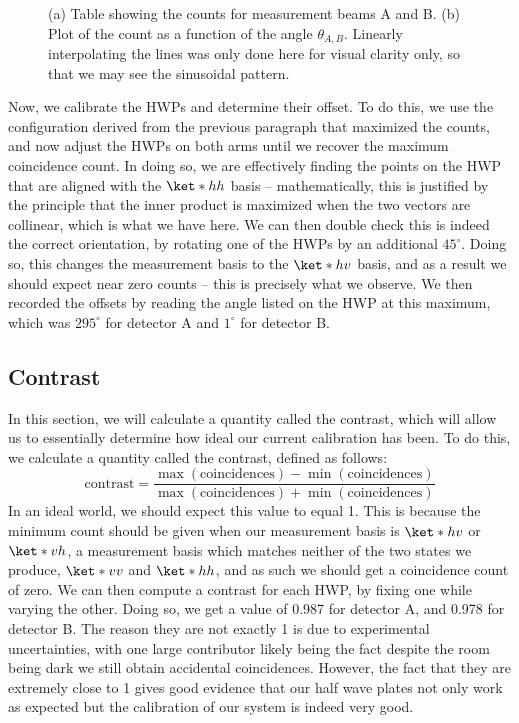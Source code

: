 \documentclass[10pt]{article}
\begin{document}
\begin{figure}
\begin{subfigure}{0.45\textwidth}
			\caption{}
			\label{count-plot}
		\end{subfigure}
		\caption{(a) Table showing the counts for measurement beams A and B. (b) Plot of the count as a
			function of the angle \( \theta_{A, B} \). Linearly interpolating the lines was only done here
		for visual clarity only, so that we may see the sinusoidal pattern.}
	\end{figure}

	Now, we calibrate the HWPs and determine their offset. To do this, we 
	use the configuration derived from the previous paragraph that maximized the counts, and now adjust the
	HWPs on both arms until we recover the maximum coincidence count. In doing so, we are effectively
	finding the points on the HWP that are aligned with the \( \ket*{hh} \) basis -- mathematically, this is
	justified by the principle that the inner product is maximized when the two vectors are collinear, which
	is what we have here. We can then double check this is indeed the correct orientation, by rotating one
	of the HWPs by an additional \( 45^{\circ} \). Doing so, this changes the measurement basis to the \(
	\ket*{hv} \) basis, and as a result we should expect near zero counts -- this is precisely what we
	observe. We then recorded the offsets by reading the angle listed on the HWP at this maximum, which was
	\( 295^{\circ} \) for detector A and \( 1^{\circ} \) for detector B.  

	\subsection{Contrast}
	
	In this section, we will calculate a quantity called the contrast, which will allow us to essentially
	determine how ideal our current calibration has been. To do this, we calculate a quantity called the
	contrast, defined as follows:
	\[
		\text{contrast} = \frac{\max(\text{coincidences}) -
		\min(\text{coincidences})}{\max(\text{coincidences}) + \min(\text{coincidences})}
	\]
	In an ideal world, we should expect this value to equal 1. This is because the
	minimum count should be given when our measurement basis is \( \ket*{hv} \) or \( \ket*{vh} \), a
	measurement basis which matches neither of the two states we produce, 
	\( \ket*{vv} \) and \( \ket*{hh} \), and as such we should get a coincidence count of zero. We can then
	compute a contrast for each HWP, by fixing one while varying the other. Doing so, we get a value of 0.987 
	for detector A, and 0.978 for detector B. The reason
	they are not exactly 1 is due to experimental uncertainties, with one large contributor likely being the
	fact despite the room being dark we still obtain accidental coincidences. 
	However, the fact that they are extremely close to 1 gives good evidence that our half wave plates not
	only work as expected but the calibration of our system is indeed very good. 
\end{document}
